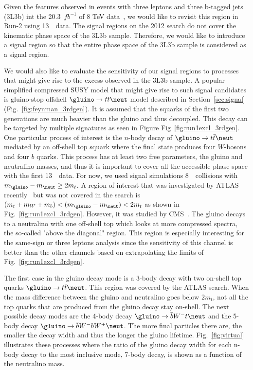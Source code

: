 \label{sec:3l3b}

\par Given the features observed in events with  three leptons and
three b-tagged jets (3L3b) int the 20.3~$fb^{-1}$ of 8 TeV
data~\cite{3l3b}, we would like to revisit this region in Run-2 using
13~\TeV\ data. The signal regions on the 2012 search do not cover the
kinematic phase space of the 3L3b sample. Therefore, we would like to
introduce a signal region so that the entire phase space of the 3L3b
sample is considered as a signal region.  

\par We would also like to evaluate the sensitivity of our signal
regions to processes that might give rise to the excess observed in
the 3L3b sample. A popular simplified compressed SUSY model that might
give rise to such signal candidates is 
gluino-stop offshell $\gluino\to t\bar t\neut$ model described in 
Section~\ref{sec:signal} 
(Fig.~\ref{fig:feynman_3rdgen}). 
It is assumed that the
squarks of the first two generations are much heavier than the gluino
and thus decoupled. This decay can be targeted by multiple signatures
as seen in Figure Fig~\ref{fig:run1excl_3rdgen}. One particular
process of interest is the $n$-body decay of $\gluino\to t\bar{t}\neut$
mediated by an off-shell top squark where the final state produces
four $W$-bosons and four $b$ quarks. This process has at least two
free parameters, the gluino and neutralino masses, and thus it is
important to cover all the accessible phase space with the first
13~\TeV\ data. For now, we used signal simulations 8~\TeV\ collisions
with $m_{\gluino}-m_{\neut} \geq 2 m_t$. A region of interest that was
investigated by ATLAS recently~\cite{Maurer:1966089} but was not covered in the search is
$(m_t+m_W+m_b) < (m_{\gluino}-m_{\neut})< 2m_t$ as shown in
Fig.~\ref{fig:run1excl_3rdgen}. However, it was studied by
CMS~\cite{cms_summ}.
The gluino decays to a neutralino with one off-shell top which looks
at more compressed spectra, the so-called "above the diagonal"
region. This region is especially interesting for the same-sign or
three leptons analysis since the sensitivity of this channel is better
than the other channels based on extrapolating the limits of
Fig.~\ref{fig:run1excl_3rdgen}.
 
\par The first case in the gluino decay mode is a 3-body decay with two
on-shell top quarks $\gluino\to t\bar t\neut$. This region was covered
by the ATLAS search. When the mass difference between the gluino and
neutralino goes below $2m_t$, not all the top quarks that are
produced from the gluino decay stay on-shell. The next possible decay
modes are the 4-body decay $\gluino\to\bar{b}W^-t \neut$ and the
5-body decay $\gluino\to\bar{b}W^-bW^+ \neut$. The more final
particles there are, the smaller the decay width and thus the longer
the gluino lifetime. Fig.~\ref{fig:virtual} illustrates these
processes where the ratio of the gluino decay width for each n-body
decay to the most inclusive mode, 7-body decay, is shown as a function
of the neutralino mass.

